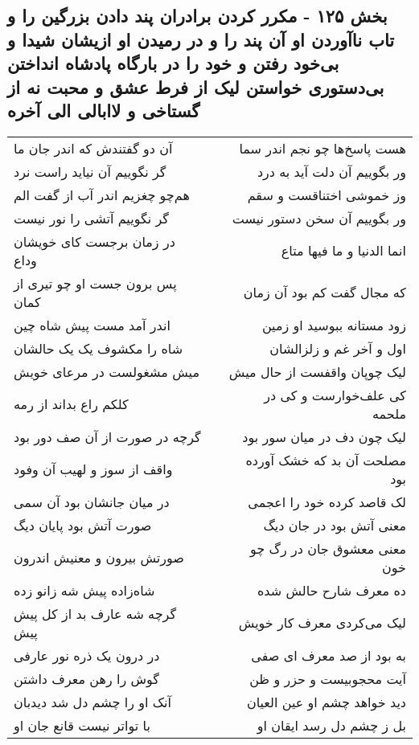 \begin{center}
\section*{بخش ۱۲۵ - مکرر کردن برادران پند دادن بزرگین را و تاب ناآوردن او آن پند را و در رمیدن او ازیشان شیدا و بی‌خود رفتن و خود را در بارگاه پادشاه انداختن بی‌دستوری خواستن لیک از فرط عشق و محبت نه از گستاخی و لاابالی الی آخره}
\label{sec:sh125}
\begin{longtable}{l p{0.5cm} r}
آن دو گفتندش که اندر جان ما
&&
هست پاسخ‌ها چو نجم اندر سما
\\
گر نگوییم آن نیاید راست نرد
&&
ور بگوییم آن دلت آید به درد
\\
هم‌چو چغزیم اندر آب از گفت الم
&&
وز خموشی اختناقست و سقم
\\
گر نگوییم آتشی را نور نیست
&&
ور بگوییم آن سخن دستور نیست
\\
در زمان برجست کای خویشان وداع
&&
انما الدنیا و ما فیها متاع
\\
پس برون جست او چو تیری از کمان
&&
که مجال گفت کم بود آن زمان
\\
اندر آمد مست پیش شاه چین
&&
زود مستانه ببوسید او زمین
\\
شاه را مکشوف یک یک حالشان
&&
اول و آخر غم و زلزالشان
\\
میش مشغولست در مرعای خویش
&&
لیک چوپان واقفست از حال میش
\\
کلکم راع بداند از رمه
&&
کی علف‌خوارست و کی در ملحمه
\\
گرچه در صورت از آن صف دور بود
&&
لیک چون دف در میان سور بود
\\
واقف از سوز و لهیب آن وفود
&&
مصلحت آن بد که خشک آورده بود
\\
در میان جانشان بود آن سمی
&&
لک قاصد کرده خود را اعجمی
\\
صورت آتش بود پایان دیگ
&&
معنی آتش بود در جان دیگ
\\
صورتش بیرون و معنیش اندرون
&&
معنی معشوق جان در رگ چو خون
\\
شاه‌زاده پیش شه زانو زده
&&
ده معرف شارح حالش شده
\\
گرچه شه عارف بد از کل پیش پیش
&&
لیک می‌کردی معرف کار خویش
\\
در درون یک ذره نور عارفی
&&
به بود از صد معرف ای صفی
\\
گوش را رهن معرف داشتن
&&
آیت محجوبیست و حزر و ظن
\\
آنک او را چشم دل شد دیدبان
&&
دید خواهد چشم او عین العیان
\\
با تواتر نیست قانع جان او
&&
بل ز چشم دل رسد ایقان او

\end{longtable}
\end{center}
